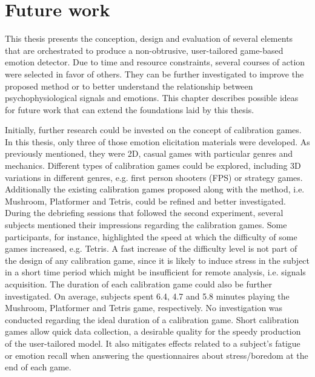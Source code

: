 \chapter{Future work}
\label{ch:closing}

This thesis presents the conception, design and evaluation of several elements that are orchestrated to produce a non-obtrusive, user-tailored game-based emotion detector. Due to time and resource constraints, several courses of action were selected in favor of others. They can be further investigated to improve the proposed method or to better understand the relationship between psychophysiological signals and emotions. This chapter describes possible ideas for future work that can extend the foundations laid by this thesis.

Initially, further research could be invested on the concept of calibration games. In this thesis, only three of those emotion elicitation materials were developed. As previously mentioned, they were 2D, casual games with particular genres and mechanics. Different types of calibration games could be explored, including 3D variations in different genres, e.g. first person shooters (FPS) or strategy games. Additionally the existing calibration games proposed along with the method, i.e. Mushroom, Platformer and Tetris, could be refined and better investigated. During the debriefing sessions that followed the second experiment, several subjects mentioned their impressions regarding the calibration games. Some participants, for instance, highlighted the speed at which the difficulty of some games increased, e.g. Tetris. A fast increase of the difficulty level is not part of the design of any calibration game, since it is likely to induce stress in the subject in a short time period which might be insufficient for remote analysis, i.e. signals acquisition. The duration of each calibration game could also be further investigated. On average, subjects spent 6.4, 4.7 and 5.8 minutes playing the Mushroom, Platformer and Tetris game, respectively. No investigation was conducted regarding the ideal duration of a calibration game. Short calibration games allow quick data collection, a desirable quality for the speedy production of the user-tailored model. It also mitigates effects related to a subject's fatigue or emotion recall when answering the questionnaires about stress/boredom at the end of each game.


